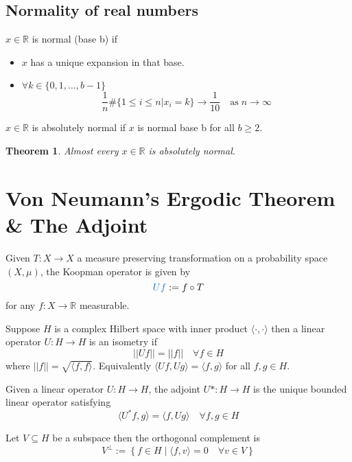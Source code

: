 \documentclass[11pt]{article}
\newcommand{\defeq}{:=}
\newcommand{\norm}[1]{\left|\left|#1\right|\right|}
\newcommand{\relmiddle}[1]{\mathrel{}\middle#1\mathrel{}}
\newcommand{\rmv}{\relmiddle|}
\newcommand{\R}{\mathbb{R}}
\newenvironment{defin}
	{\begin{mdframed}[backgroundcolor=white, roundcorner=5pt, linewidth=1pt, linecolor=RoyalBlue]}
	{\end{mdframed}}
\newcommand{\mdf}[1]{{\color{RoyalBlue} #1}}
\newtheorem{theorem}[prop]{Theorem}
\begin{document}
\subsection{Normality of real numbers}
\begin{defin}
$x\in\R$ is \mdf{normal (base b)} if
\begin{itemize}
	\item $x$ has a  unique expansion in that base.
	\item $\forall k\in\{0,1,\dots,b-1\}$
		$$\frac{1}{n}\#\{1\leq i\leq n | x_i=k\}\to\frac{1}{10}\quad\text{as}\;n\to\infty$$
\end{itemize}

$x\in\R$ is \mdf{absolutely normal} if $x$ is normal base b for all $b\geq 2$.
\end{defin}
\begin{theorem}
Almost every $x\in\R$ is absolutely normal.
\end{theorem}

\section{Von Neumann's Ergodic Theorem \& The Adjoint}

\begin{defin}
	Given $T:X\to X$ a measure preserving transformation on a probability space $(X, \mu)$, the \mdf{Koopman operator} is given by
	\[
		\mdf{Uf}\defeq f\circ T
	\]
	for any $f:X\to \R$ measurable.


	Suppose $H$ is a complex Hilbert space with inner product $\langle\cdot, \cdot\rangle$ then a linear operator $U:H\to H$ is an \mdf{isometry} if
	\[
		\norm{Uf}=\norm{f}\quad\forall f\in H
	\]
	where $\norm{f}=\sqrt{\langle f, f\rangle}$.
	Equivalently $\langle Uf, Ug \rangle= \langle f, g\rangle$ for all $f,g \in H$.

	Given a linear operator $U:H\to H$, the \mdf{adjoint} $U*:H\to H$ is the unique bounded linear operator satisfying
	\[
\langle U^\ast f, g \rangle= \langle f, Ug \rangle \quad \forall f, g \in H
	\]

	Let $V\subseteq H$ be a subspace then the \mdf{orthogonal complement} is
	\[
		V^\perp \defeq \left\{ f\in H \rmv \langle f, v \rangle =0 \quad \forall v \in V\right\}
	\]
\end{defin}
\end{document}
